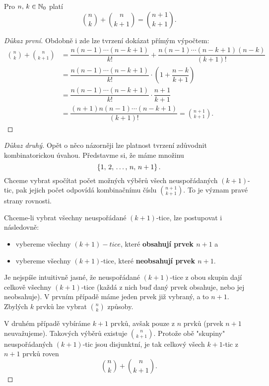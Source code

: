 \begin{theorem}\label{thm:soucet_kombinacnich_cisel}
    Pro $n,\,k\in\mathbb{N}_0$ platí
    \[\binom{n}{k}+\binom{n}{k+1}=\binom{n+1}{k+1}.\]
\end{theorem}
\begin{proof}[Důkaz první]
    Obdobně i zde lze tvrzení dokázat přímým výpočtem:
    \begin{align*}
        \binom{n}{k}+\binom{n}{k+1}&=\dfrac{n(n-1)\cdots(n-k+1)}{k!}+\dfrac{n(n-1)\cdots(n-k+1)(n-k)}{(k+1)!}\\ &=\dfrac{n(n-1)\cdots(n-k+1)}{k!}\cdot\left(1+\dfrac{n-k}{k+1}\right)\\ &=\dfrac{n(n-1)\cdots(n-k+1)}{k!}\cdot\dfrac{n+1}{k+1}\\ &=\dfrac{(n+1)n(n-1)\cdots(n-k+1)}{(k+1)!}=\binom{n+1}{k+1}.
    \end{align*}
\end{proof}
\begin{proof}[Důkaz druhý]
    Opět o něco názorněji lze platnost tvrzení zdůvodnit kombinatorickou úvahou. Představme si, že máme množinu
    \[\left\{1,\,2,\,\dots,\,n,\,n+1\right\}.\]
    Chceme vybrat spočítat počet možných výběrů všech neuspořádaných $(k+1)$-tic, pak jejich počet odpovídá kombinačnímu číslu $\binom{n+1}{k+1}$. To je význam pravé strany rovnosti.\par
    Chceme-li vybrat všechny neuspořádané $(k+1)$-tice, lze postupovat i následovně:
    \begin{itemize}
        \item vybereme všechny $(k+1)-tice$, které \textbf{obsahují prvek $n+1$} a
        \item vybereme všechny $(k+1)$-tice, které \textbf{neobsahují prvek $n+1$}.
    \end{itemize}
    Je nejspíše intuitivně jasné, že neuspořádané $(k+1)$-tice z obou skupin dají celkově všechny $(k+1)$-tice (každá z nich buď daný prvek obsahuje, nebo jej neobsahuje). V prvním případě máme jeden prvek již vybraný, a to $n+1$. Zbylých $k$ prvků lze vybrat $\binom{n}{k}$ způsoby.\par
    V druhém případě vybíráme $k+1$ prvků, avšak pouze z $n$ prvků (prvek $n+1$ neuvažujeme). Takových výběrů existuje $\binom{n}{k+1}$. Protože obě "skupiny" neuspořádaných $(k+1)$-tic jsou disjunktní, je tak celkový všech $k+1$-tic z $n+1$ prvků roven
    \[\binom{n}{k}+\binom{n}{k+1}.\]
\end{proof}